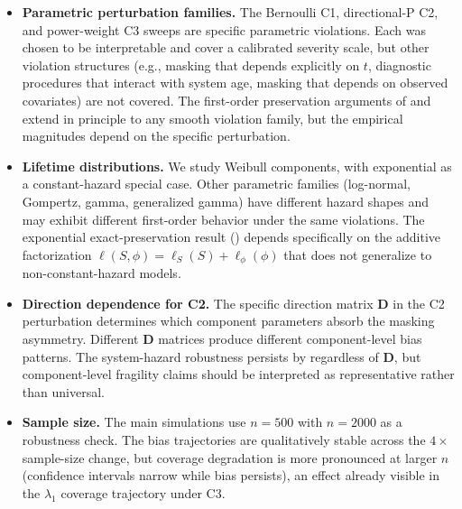 \begin{itemize}
    \item \textbf{Parametric perturbation families.} The Bernoulli C1,
        directional-P C2, and power-weight C3 sweeps are specific
        parametric violations. Each was chosen to be interpretable and
        cover a calibrated severity scale, but other violation
        structures (e.g., masking that depends explicitly on $t$,
        diagnostic procedures that interact with system age, masking
        that depends on observed covariates) are not covered. The
        first-order preservation arguments of 
        and  extend in principle to any
        smooth violation family, but the empirical magnitudes depend on
        the specific perturbation.

    \item \textbf{Lifetime distributions.} We study Weibull components,
        with exponential as a constant-hazard special case. Other
        parametric families (log-normal, Gompertz, gamma, generalized
        gamma) have different hazard shapes and may exhibit different
        first-order behavior under the same violations. The exponential
        exact-preservation result () depends
        specifically on the additive factorization
        $\ell(S, \phi) = \ell_S(S) + \ell_\phi(\phi)$ that does not
        generalize to non-constant-hazard models.

    \item \textbf{Direction dependence for C2.} The specific direction
        matrix $\mathbf{D}$ in the C2 perturbation determines which
        component parameters absorb the masking asymmetry. Different
        $\mathbf{D}$ matrices produce different component-level bias
        patterns. The system-hazard robustness persists by
         regardless of $\mathbf{D}$, but
        component-level fragility claims should be interpreted as
        representative rather than universal.

    \item \textbf{Sample size.} The main simulations use $n = 500$
        with $n = 2000$ as a robustness check. The bias trajectories
        are qualitatively stable across the $4\times$ sample-size
        change, but coverage degradation is more pronounced at larger
        $n$ (confidence intervals narrow while bias persists), an
        effect already visible in the $\lambda_1$ coverage trajectory
        under C3.


\end{itemize}
